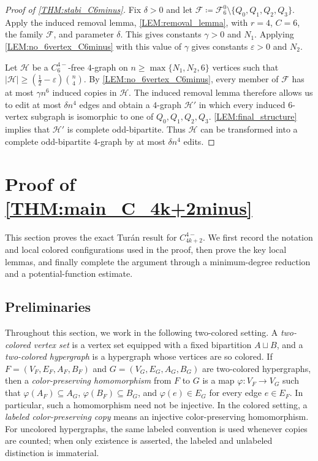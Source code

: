 \documentclass[10pt,a4paper]{article}
\theoremstyle{plain}
\theoremstyle{definition}
\begin{document}
\begin{proof}[Proof of \cref{THM:stabi_C6minus}]
Fix $\delta>0$ and let $\mathcal F\coloneqq\mathcal{F}_{6}^{0}\setminus\{Q_0,Q_1,Q_2,Q_3\}$.  
Apply the induced removal lemma, \cref{LEM:removal_lemma}, with $r=4$, $C=6$, the family $\mathcal F$, and parameter $\delta$.  This gives constants $\gamma>0$ and $N_1$.  Applying \cref{LEM:no_6vertex_C6minus} with this value of $\gamma$ gives constants $\varepsilon>0$ and $N_2$.

Let $\mathcal H$ be a $C_6^{4-}$-free $4$-graph on $n\ge \max\{N_1,N_2,6\}$ vertices such that $|\mathcal H|\ge \left(\frac12-\varepsilon\right)\binom n4$.
By \cref{LEM:no_6vertex_C6minus}, every member of $\mathcal F$ has at most $\gamma n^6$ induced copies in $\mathcal H$.  The induced removal lemma therefore allows us to edit at most $\delta n^4$ edges and obtain a $4$-graph $\mathcal H'$ in which every induced $6$-vertex subgraph is isomorphic to one of $Q_0,Q_1,Q_2,Q_3$.  \cref{LEM:final_structure} implies that $\mathcal H'$ is complete odd-bipartite.  Thus $\mathcal H$ can be transformed into a complete odd-bipartite $4$-graph by at most $\delta n^4$ edits.
\end{proof}


\section{Proof of \texorpdfstring{\cref{THM:main_C_4k+2minus}}{Theorem}}\label{SEC:C6minus_exact}

This section proves the exact Tur\'{a}n result for $C_{4k+2}^{4-}$.  We first record the notation and local colored configurations used in the proof, then prove the key local lemmas, and finally complete the argument through a minimum-degree reduction and a potential-function estimate.

\subsection{Preliminaries}\label{SUBSEC:exact-preliminaries}

Throughout this section, we work in the following two-colored setting.  A \emph{two-colored vertex set} is a vertex set equipped with a fixed bipartition $A\sqcup B$, and a \emph{two-colored hypergraph} is a hypergraph whose vertices are so colored.  If $F=(V_F,E_F,A_F,B_F)$ and $G=(V_G,E_G,A_G,B_G)$ are two-colored hypergraphs, then a \emph{color-preserving homomorphism} from $F$ to $G$ is a map $\varphi:V_F\to V_G$ such that $\varphi(A_F)\subseteq A_G$, $\varphi(B_F)\subseteq B_G$, and $\varphi(e)\in E_G$ for every edge $e\in E_F$.  In particular, such a homomorphism need not be injective.  In the colored setting, a \emph{labeled color-preserving copy} means an injective color-preserving homomorphism.  For uncolored hypergraphs, the same labeled convention is used whenever copies are counted; when only existence is asserted, the labeled and unlabeled distinction is immaterial.
\end{document}
